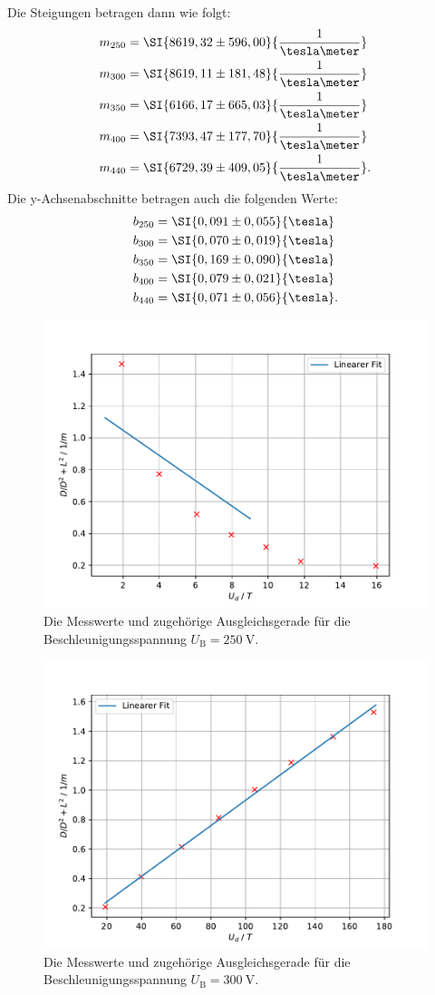 Die Steigungen betragen dann wie folgt:
\begin{align*}
m_{250} &= \SI{8619,32 \pm 596,00}{\frac{1}{\tesla\meter}} \\
m_{300} &= \SI{8619,11 \pm 181,48}{\frac{1}{\tesla\meter}} \\
m_{350} &= \SI{6166,17 \pm 665,03}{\frac{1}{\tesla\meter}} \\
m_{400} &= \SI{7393,47 \pm 177,70}{\frac{1}{\tesla\meter}} \\
m_{440} &= \SI{6729,39 \pm 409,05}{\frac{1}{\tesla\meter}}.
\end{align*}
Die y-Achsenabschnitte betragen auch die folgenden Werte:
\begin{align*}
b_{250} &= \SI{0,091 \pm 0,055}{\tesla} \\
b_{300} &= \SI{0,070 \pm 0,019}{\tesla} \\
b_{350} &= \SI{0,169 \pm 0,090}{\tesla} \\
b_{400} &= \SI{0,079 \pm 0,021}{\tesla} \\
b_{440} &= \SI{0,071 \pm 0,056}{\tesla}.
\end{align*}

\begin{figure}[h!]
	\centering
	\includegraphics[width=0.7\linewidth]{../../V250}
	\caption{Die Messwerte und zugehörige Ausgleichsgerade für die Beschleunigungsspannung $U_\text{B} = \SI{250}{\volt}$.}
	\label{fig:v250}
\end{figure}

\begin{figure}[h!]
	\centering
	\includegraphics[width=0.7\linewidth]{../../V300}
	\caption{Die Messwerte und zugehörige Ausgleichsgerade für die Beschleunigungsspannung $U_\text{B} = \SI{300}{\volt}$.}
	\label{fig:v300}
\end{figure}

